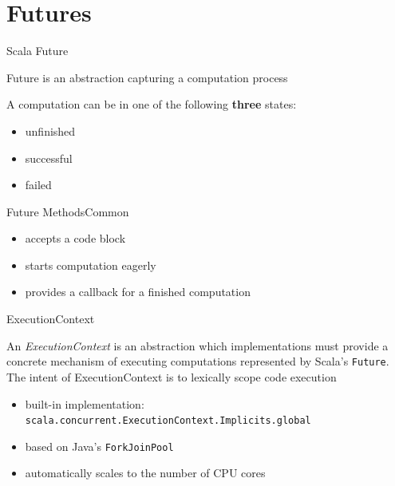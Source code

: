 \documentclass[aspectratio=169]{beamer}
\begin{document}
\section{Futures}
\begin{frame}{Scala Future}
  \begin{block}{}
    Future is an abstraction capturing a computation process
  \end{block}
  \bigskip
  A computation can be in one of the following \textbf{three} states:
  \begin{itemize}
    \item unfinished
    \item successful
    \item failed
  \end{itemize}
\end{frame}

\begin{frame}[fragile]{Future Methods}{Common}
  \begin{itemize}
    \item accepts a code block
    \item starts computation eagerly
  \end{itemize}
  \bigskip
  \pause
  \begin{itemize}
    \item provides a callback for a finished computation
  \end{itemize}
\end{frame}

\begin{frame}[fragile]{ExecutionContext}
\begin{block}{}
  An \textit{ExecutionContext} is an abstraction which implementations must provide a concrete mechanism
  of executing computations represented by Scala's \texttt{Future}. The intent of ExecutionContext
  is to lexically scope code execution
\end{block}
\medskip
\begin{itemize}
  \item built-in implementation:\\
    \texttt{scala.concurrent.ExecutionContext.Implicits.global}
  \item based on Java's \texttt{ForkJoinPool}
  \item automatically scales to the number of CPU cores
\end{itemize}
\end{frame}
\end{document}
